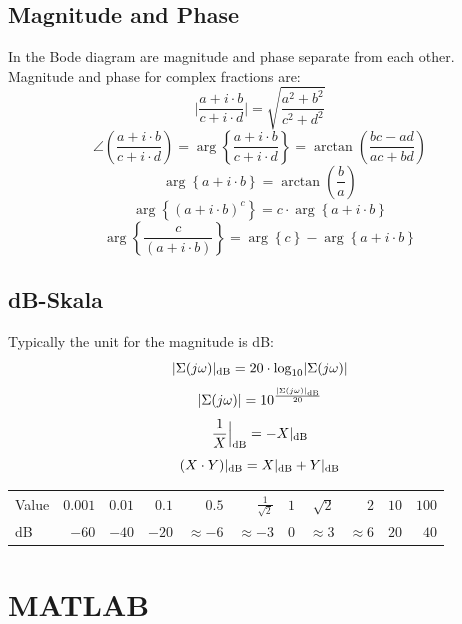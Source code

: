 \documentclass[a4paper,12 pt]{article}
\numberwithin{equation}{section}
\theoremstyle{definition}
\theoremstyle{remark}
\theoremstyle{definition}
\theoremstyle{definition}
\theoremstyle{definition}
\theoremstyle{remark}
\begin{document}
  \subsection{Magnitude and Phase}\label{betragphase}
 In the Bode diagram are magnitude and phase separate from each other. Magnitude and phase for complex fractions are:
  \[ \Big\vert \frac{a + i \cdot b}{c + i \cdot d}\Big\vert = \sqrt{\frac{a^2 + b^2}{c^2 + d^2}}\]
  \[ \angle \left( \frac{a + i \cdot b}{c + i \cdot d}\right) = \arg \left\{ \frac{a + i \cdot b}{c + i \cdot d}\right\}= \arctan \left( \frac{bc - ad}{ac + bd}\right)\]
  \[ \arg \left\{ a + i \cdot b\right\} = \arctan \left( \frac{b}{a}\right)\]
  \[ \arg \left\{ (a + i \cdot b)^c\right\} = c \cdot \arg \left\{ a + i \cdot b\right\}\]
  \[ \arg \left\{ \frac{c}{(a + i \cdot b)}\right\} = \arg \left\{ c\right\} - \arg \left\{ a + i \cdot b\right\}\]
  \subsection{dB-Skala}
  Typically the unit for the magnitude is dB:
  \[ |\Sigma(j \omega)|_{\textnormal{dB}}=20 \cdot \textnormal{log}_{10} |\Sigma (j \omega)|\]
  \[ |\Sigma (j \omega)| = 10^{\frac{|\Sigma(j \omega)|_{\textnormal{dB}}}{20}}\]
  \[ \frac{1}{X}\Big\vert_{\textnormal{dB}}= -X|_{\textnormal{dB}}\]
  \[ (X\cdot Y)|_{\textnormal{dB}} = X|_{\textnormal{dB}} + Y|_{\textnormal{dB}}\]
  \begin{center}
  \begin{tabular}[width=\columnwidth]{l|rrrrrrrrrr}
  \toprule
  Value& $0.001$&$0.01$ & $0.1$ & $0.5$ & $\frac{1}{\sqrt{2}}$ & $1$ & $\sqrt{2}$ & $2$ & $10$ & $100$ \\
  dB & $-60$ & $-40$ & $-20$ & $\approx -6$ & $\approx -3$ & $0$ &$\approx 3$ & $\approx 6$ & $20$ & $40$\\
  \bottomrule
  \end{tabular}
  \end{center}

\newpage
\section{MATLAB}
\end{document}
